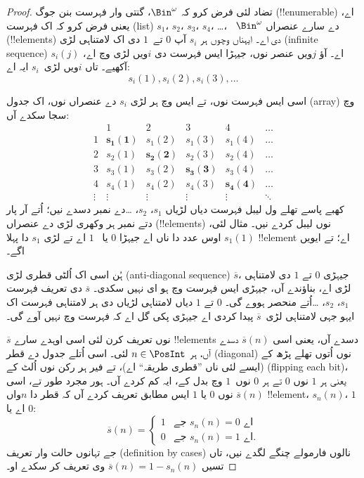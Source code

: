 \documentclass[../../../include/open-logic-section]{subfiles}
\begin{document}
\begin{proof}
تضاد لئی فرض کرو کہ $\Bin^\omega$، گنتی وار فہرست بنن جوگ
(!!{enumerable}) اے، یعنی فرض کرو کہ اک فہرست (list) $s_{1}$،
$s_{2}$، $s_{3}$، $s_{4}$، \dots{}، ~$\Bin^\omega$ دے سارے
عنصراں (!!{element}s) دی اے۔ ایہناں وچوں ہر $s_i$ آپ $0$ تے~$1$
دی اک لامتناہی لڑی (infinite sequence) اے۔ آؤ $j$ویں عنصر نوں، جیہڑا
ایس فہرست دی
$i$ویں لڑی وچ اے، $s_i(j)$ آکھیے۔ تاں $i$ویں لڑی~$s_i$ ایہ اے:
\[
s_i(1), s_i(2), s_i(3), \dots
\]

اسی ایس فہرست نوں، تے ایس وچ ہر لڑی $s_i$ دے عنصراں نوں، اک جدول
(array) وچ سجا سکدے آں:
\[
\begin{array}{c|c|c|c|c|c}
& 1 & 2 & 3 & 4 & \dots \\\hline
1 & \mathbf{s_{1}(1)} & s_{1}(2) & s_{1}(3) & s_1(4) & \dots \\\hline
2 & s_{2}(1)& \mathbf{s_{2}(2)} & s_2(3) & s_2(4) & \dots \\\hline
3 & s_{3}(1)& s_{3}(2) & \mathbf{s_3(3)} & s_3(4) & \dots \\\hline
4 & s_{4}(1)& s_{4}(2) & s_4(3) & \mathbf{s_4(4)} & \dots \\\hline
\vdots & \vdots & \vdots & \vdots & \vdots & \mathbf{\ddots}
\end{array}
\]
کھبے پاسے تھلے ول لیبل فہرست دیاں لڑیاں $s_1$، $s_2$، \dots دے
نمبر دسدے نیں؛ اُتے آر پار دتے نمبر ہر وکھری لڑی دے عنصراں
(!!{element}s) نوں
لیبل کردے نیں۔ مثال لئی، $s_{1}(1)$ اوس عدد دا ناں اے جیہڑا $0$ یا
~$1$ اے تے لڑی $s_{1}$ دا پہلا !!{element} اے؛ تے ایویں اگے۔

ہُن اسی اک اُلٹی قطری لڑی (anti-diagonal sequence) $\overline{s}$،
جیہڑی $0$ تے $1$ دی لامتناہی لڑی اے، بناؤندے آں، جیہڑی ایس فہرست وچ
ہو ای نہیں سکدی۔ $\overline{s}$ دی تعریف فہرست
$s_1$، $s_2$، \dots اُتے منحصر ہووے گی۔ $0$ تے $1$ دیاں لامتناہی
لڑیاں دی ہر لامتناہی فہرست اک ایہو جہی لامتناہی لڑی~$\overline{s}$
پیدا کردی اے جیہڑی پکی گل اے کہ فہرست وچ نہیں آوے گی۔

$\overline{s}$ نوں تعریف کرن لئی اسی اوہدے سارے !!{element}s دسدے آں،
یعنی اسی $\overline{s}(n)$ دسدے آں، ہر $n \in \PosInt$ لئی۔ اسی اُتلے
جدول دے قطر (diagonal) نوں اُتوں تھلے پڑھ کے (ایسے لئی ناں ”قطری
طریقہ“ اے)، تے فیر ہر رکن نوں اُلٹ کے (flipping each bit)، یعنی ہر
$1$ نوں $0$ تے ہر $0$ نوں~$1$ وچ بدل کے، ایہ کم کردے آں۔ ہور
مجرد طور تے، اسی $\overline{s}(n)$ نوں $0$ یا $1$ ایس مطابق تعریف
کردے آں کہ قطر دا $n$واں !!{element}، $s_n(n)$، $1$ اے یا $0$:
\[
\overline{s}(n) =
\begin{cases}
1 & \text{جے $s_{n}(n) = 0$ اے}\\
0 & \text{جے $s_{n}(n) = 1$ اے}.
\end{cases}
\]
جے تہانوں حالت وار تعریف (definition by cases) نالوں فارمولے چنگے
لگدے نیں، تاں تسیں
$\overline{s}(n) = 1 - s_n(n)$ وی تعریف کر سکدے او۔


\end{proof}
\end{document}
